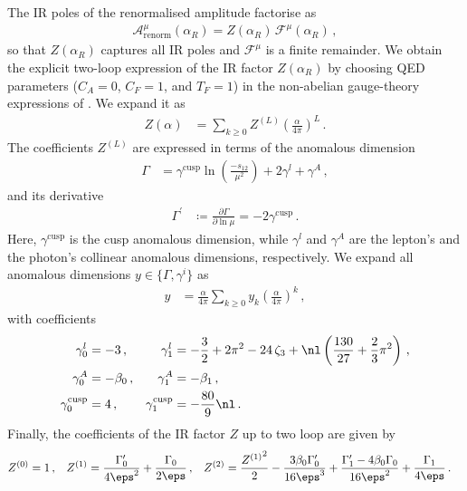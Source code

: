 The \ac{IR} poles of the renormalised amplitude factorise as~\cite{Catani:1998bh,Gardi:2009qi,Gardi:2009zv,Becher:2009cu,Becher:2009qa}
\begin{align}
 \mathcal{A}^\mu_\text{renorm}(\alpha_R) = Z(\alpha_R) \,  \mathcal{F}^\mu(\alpha_R) \,,
\end{align}
so that $ Z(\alpha_R)$ captures all \ac{IR} poles and $\mathcal{F}^\mu$ is a finite remainder.
We obtain the explicit two-loop expression of the \ac{IR} factor $Z(\alpha_R)$ by
choosing \ac{QED} parameters ($C_A=0$, $C_F=1$, and $T_F=1$) in the non-abelian gauge-theory expressions of . We expand it as
\begin{align}
    Z(\alpha) &= \sum_{k\ge0} Z^{(L)} \left(\frac{\alpha}{4\pi}\right)^L \,.
\end{align}
The coefficients $Z^{(L)}$ are expressed in terms of the anomalous dimension
\begin{align}
    \Gamma &= \gamma^\text{cusp}\ln\left(\frac{-s_{12}}{\mu^2}\right)+2\gamma^l+\gamma^A \,,
\end{align}
and its derivative
\begin{align}
    \Gamma^\prime &\coloneqq \frac{\partial\Gamma}{\partial\ln\mu} = -2\gamma^\text{cusp} \,.
\end{align}
Here, $\gamma^\text{cusp}$ is the cusp anomalous dimension, while $\gamma^l$ and $\gamma^A$ are the lepton's and the photon's collinear anomalous dimensions, respectively.
We expand all anomalous dimensions $y\in\{\Gamma,\gamma^i\}$ as
\begin{align}
    y &= \frac{\alpha}{4\pi} \sum_{k\ge0} y_k \left(\frac{\alpha}{4\pi}\right)^k \,,
\end{align}
with coefficients
\begin{subequations}
\begin{align}
    \gamma^l_0 &= -3 \,, &
    \gamma^l_1 &= -\frac{3}{2}+2\pi^2-24 \, \zeta_3+\nl\left(\frac{130}{27}+\frac{2}{3}\pi^2\right) \,, \\
    \gamma^A_0 &= -\beta_0 \,, &
    \gamma^A_1 &= -\beta_1 \,, \\
    \gamma^\text{cusp}_0 &= 4 \,, &
    \gamma^\text{cusp}_1 &= -\frac{80}{9} \nl \,.
\end{align}
\end{subequations}
Finally, the coefficients of the \ac{IR} factor $Z$ up to two loop are given by
\begin{align}
    \label{eq:ir-pole-coeffs}
    Z^{(0)} &= 1 \,, &
    Z^{(1)} &= \frac{\Gamma_0^\prime}{4\eps^2}+\frac{\Gamma_0}{2\eps} \,, &
    Z^{(2)} &= \frac{{Z^{(1)}}^2}{2} -\frac{3\beta_0\Gamma_0^\prime}{16\eps^3}+\frac{\Gamma_1^\prime-4\beta_0\Gamma_0}{16\eps^2}+\frac{\Gamma_1}{4\eps} \,.
\end{align}

